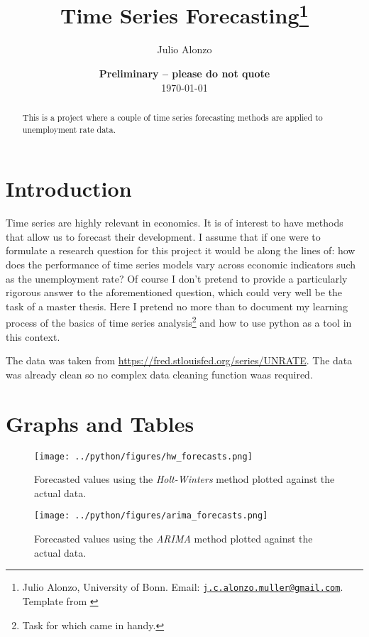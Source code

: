 \documentclass[11pt, a4paper, leqno]{article}
\title{Time Series Forecasting\thanks{Julio Alonzo, University of Bonn. Email: \href{mailto:j.c.alonzo.muller@gmail.com}{\nolinkurl{j.c.alonzo.muller@gmail.com}}. Template from \cite{GaudeckerEconProjectTemplates}}}
\author{Julio Alonzo}
\date{
    {\bf Preliminary -- please do not quote}
    \\[1ex]
    \today
}
\begin{document}
\maketitle

\begin{abstract}
This is a project where a couple of time series forecasting methods are applied to unemployment rate data.
\end{abstract}

\section{Introduction}

Time series are highly relevant in economics. It is of interest to have methods that allow us to forecast their development.
I assume that if one were to formulate a research question for this project it would be along the lines of: how does the performance of time series models vary across economic indicators such as the unemployment rate?
Of course I don't pretend to provide a particularly rigorous answer to the aforementioned question, which could very well be the task of a master thesis. Here I pretend no more than to document my learning process of the basics of time series analysis\footnote{Task for which \cite{huang2022applied} came in handy.} and how to use python as a tool in this context.

The data was taken from \url{https://fred.stlouisfed.org/series/UNRATE}. The data was already clean so no complex data cleaning function waas required.

\section{Graphs and Tables}

\begin{figure}[H]

    \centering
    \texttt{[image: ../python/figures/hw\_forecasts.png]}

    \caption{Forecasted values using the \emph{Holt-Winters} method plotted against the actual data.}
    \label{fig:hw}

\end{figure}

\begin{figure}[H]

    \centering
    \texttt{[image: ../python/figures/arima\_forecasts.png]}

    \caption{Forecasted values using the \emph{ARIMA} method plotted against the actual data.}
    \label{fig:arima}

\end{figure}
\end{document}
